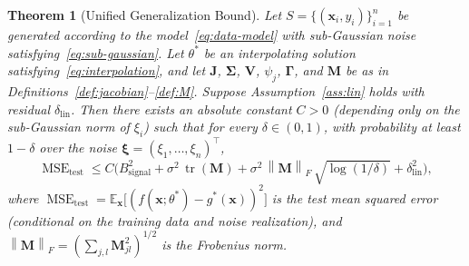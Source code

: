 \documentclass[12pt]{amsart}
\newtheorem{theorem}{Theorem}[section]
\theoremstyle{definition}
\theoremstyle{remark}
\DeclareMathOperator{\tr}{tr}
\DeclareMathOperator{\MSE}{MSE}
\newcommand{\E}{\mathbb{E}}
\newcommand{\bx}{\mathbf{x}}
\newcommand{\bJ}{\mathbf{J}}
\newcommand{\bM}{\mathbf{M}}
\newcommand{\bV}{\mathbf{V}}
\newcommand{\norm}[1]{\left\lVert #1 \right\rVert}
\begin{document}
\begin{theorem}[Unified Generalization Bound]\label{thm:main}
Let $S = \{(\bx_{i}, y_{i})\}_{i=1}^{n}$ be generated according to the
model~\eqref{eq:data-model} with sub-Gaussian noise
satisfying~\eqref{eq:sub-gaussian}.  Let $\theta^{*}$ be an interpolating
solution satisfying~\eqref{eq:interpolation}, and let $\bJ$,
$\boldsymbol{\Sigma}$, $\bV$, $\psi_{j}$, $\boldsymbol{\Gamma}$, and $\bM$ be
as in Definitions~\ref{def:jacobian}--\ref{def:M}.  Suppose
Assumption~\ref{ass:lin} holds with residual $\delta_{\mathrm{lin}}$.  Then
there exists an absolute constant $C > 0$ (depending only on the
sub-Gaussian norm of $\xi_{i}$) such that for every
$\delta \in (0, 1)$, with probability at least $1 - \delta$ over the noise
$\boldsymbol{\xi} = (\xi_{1}, \ldots, \xi_{n})^{\top}$,
\begin{equation}\label{eq:main-bound}
  \MSE_{\mathrm{test}}
  \leq C\bigl(B_{\mathrm{signal}}^{2}
       + \sigma^{2}\,\tr(\bM)
       + \sigma^{2}\,\norm{\bM}_{F}\,\sqrt{\log(1/\delta)}
       + \delta_{\mathrm{lin}}^{2}\bigr),
\end{equation}
where
$\MSE_{\mathrm{test}} = \E_{\bx}\bigl[(f(\bx; \theta^{*}) - g^{*}(\bx))^{2}\bigr]$
is the test mean squared error (conditional on the training data and noise
realization), and $\norm{\bM}_{F} = (\sum_{j,l} \bM_{jl}^{2})^{1/2}$ is the
Frobenius norm.
\end{theorem}
\end{document}
